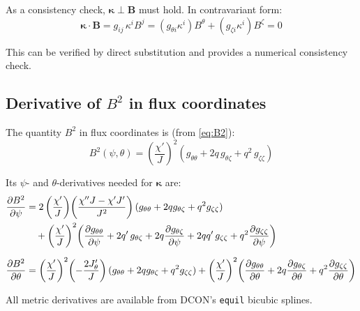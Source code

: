 \documentclass[12pt,a4paper]{article}
\begin{document}
As a consistency check, $\bm{\kappa}\perp\mathbf{B}$ must hold. In contravariant form:
\begin{equation}
    \bm{\kappa}\cdot\mathbf{B} = g_{ij}\,\kappa^i B^j
    = (g_{\theta i}\kappa^i)B^\theta + (g_{\zeta i}\kappa^i)B^\zeta = 0
    \label{eq:kappa_perp_check}
\end{equation}

This can be verified by direct substitution and provides a numerical consistency check.

\subsection{Derivative of $B^2$ in flux coordinates}

The quantity $B^2$ in flux coordinates is (from \eqref{eq:B2}):
\begin{equation}
    B^2(\psi,\theta) = \left(\frac{\chi'}{J}\right)^2\!\left(g_{\theta\theta} + 2q\,g_{\theta\zeta} + q^2\,g_{\zeta\zeta}\right)
    \label{eq:B2_explicit}
\end{equation}

Its $\psi$- and $\theta$-derivatives needed for $\bm{\kappa}$ are:
\begin{align}
    \frac{\partial B^2}{\partial\psi} &= 2\left(\frac{\chi'}{J}\right)\!\left(\frac{\chi''J - \chi'J'}{J^2}\right)(g_{\theta\theta}+2qg_{\theta\zeta}+q^2g_{\zeta\zeta}) \notag\\
    &\quad + \left(\frac{\chi'}{J}\right)^2\!\left(\frac{\partial g_{\theta\theta}}{\partial\psi} + 2q'\,g_{\theta\zeta} + 2q\frac{\partial g_{\theta\zeta}}{\partial\psi} + 2qq'\,g_{\zeta\zeta} + q^2\frac{\partial g_{\zeta\zeta}}{\partial\psi}\right)
    \label{eq:dB2dpsi}\\[6pt]
    \frac{\partial B^2}{\partial\theta} &= \left(\frac{\chi'}{J}\right)^2\!\left(-\frac{2J'_\theta}{J}\right)(g_{\theta\theta}+2qg_{\theta\zeta}+q^2g_{\zeta\zeta})
    + \left(\frac{\chi'}{J}\right)^2\!\left(\frac{\partial g_{\theta\theta}}{\partial\theta} + 2q\frac{\partial g_{\theta\zeta}}{\partial\theta} + q^2\frac{\partial g_{\zeta\zeta}}{\partial\theta}\right)
    \label{eq:dB2dtheta}
\end{align}

All metric derivatives are available from DCON's \texttt{equil} bicubic splines.
\end{document}
